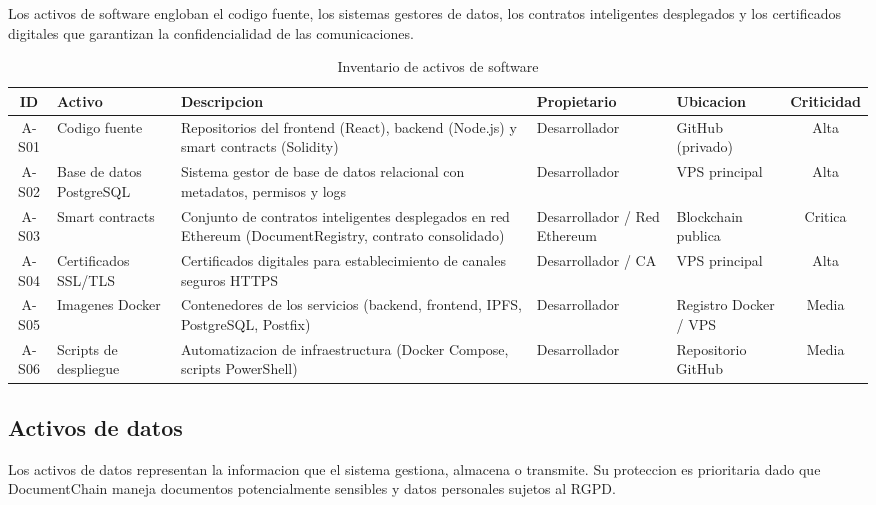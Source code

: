 \documentclass[11pt, a4paper]{article}
\begin{document}
Los activos de software engloban el codigo fuente, los sistemas gestores de datos, los contratos inteligentes desplegados y los certificados digitales que garantizan la confidencialidad de las comunicaciones.

\begin{table}[H]
\centering
\renewcommand{\arraystretch}{1.4}
\small
\begin{tabular}{|c|l|p{4.5cm}|l|l|c|}
\hline
\textbf{ID} & \textbf{Activo} & \textbf{Descripcion} & \textbf{Propietario} & \textbf{Ubicacion} & \textbf{Criticidad} \\
\hline
A-S01 & Codigo fuente & Repositorios del frontend (React), backend (Node.js) y smart contracts (Solidity) & Desarrollador & GitHub (privado) & Alta \\
\hline
A-S02 & Base de datos PostgreSQL & Sistema gestor de base de datos relacional con metadatos, permisos y logs & Desarrollador & VPS principal & Alta \\
\hline
A-S03 & Smart contracts & Conjunto de contratos inteligentes desplegados en red Ethereum (DocumentRegistry, contrato consolidado) & Desarrollador / Red Ethereum & Blockchain publica & Critica \\
\hline
A-S04 & Certificados SSL/TLS & Certificados digitales para establecimiento de canales seguros HTTPS & Desarrollador / CA & VPS principal & Alta \\
\hline
A-S05 & Imagenes Docker & Contenedores de los servicios (backend, frontend, IPFS, PostgreSQL, Postfix) & Desarrollador & Registro Docker / VPS & Media \\
\hline
A-S06 & Scripts de despliegue & Automatizacion de infraestructura (Docker Compose, scripts PowerShell) & Desarrollador & Repositorio GitHub & Media \\
\hline
\end{tabular}
\caption{Inventario de activos de software}
\label{tab:activos-software}
\end{table}

\subsection{Activos de datos}

Los activos de datos representan la informacion que el sistema gestiona, almacena o transmite. Su proteccion es prioritaria dado que DocumentChain maneja documentos potencialmente sensibles y datos personales sujetos al RGPD.
\end{document}
